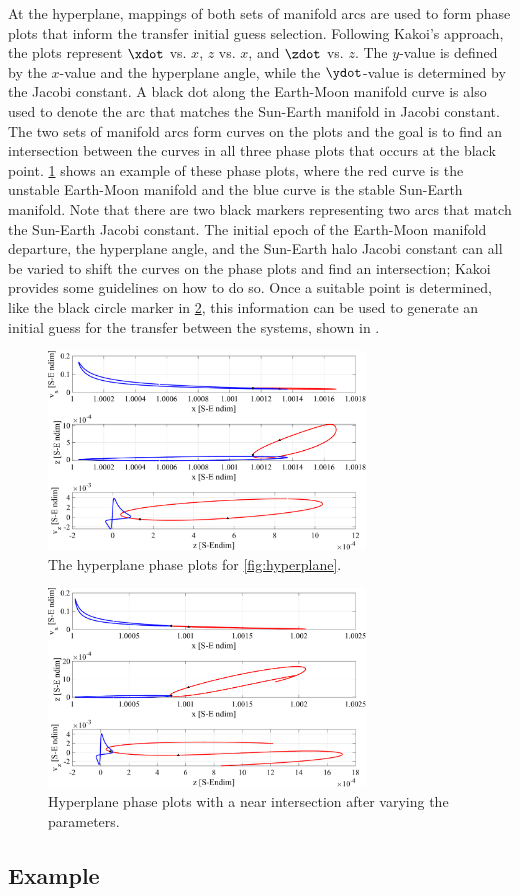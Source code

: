 At the hyperplane, mappings of both sets of manifold arcs are used to form phase plots that inform
the transfer initial guess selection. Following Kakoi's approach, the plots represent $\xdot$ vs.
$x$, $z$ vs. $x$, and $\zdot$ vs. $z$. The $y$-value is defined by the $x$-value and the hyperplane
angle, while the $\ydot$-value is determined by the Jacobi constant\cite{Kakoi:2015}. A black dot
along the Earth-Moon manifold curve is also used to denote the arc that matches the Sun-Earth
manifold in Jacobi constant. The two sets of manifold arcs form curves on the plots and the goal is
to find an intersection between the curves in all three phase plots that occurs at the black point.
\cref{fig:phasePlots} shows an example of these phase plots, where the red curve is the unstable
Earth-Moon manifold and the blue curve is the stable Sun-Earth manifold. Note that there are two
black markers representing two arcs that match the Sun-Earth Jacobi constant. The initial epoch of
the Earth-Moon manifold departure, the hyperplane angle, and the Sun-Earth halo Jacobi constant can
all be varied to shift the curves on the phase plots and find an intersection; Kakoi provides some
guidelines on how to do so\cite{Kakoi:2015}. Once a suitable point is determined, like the black
circle marker in \cref{fig:phasePlotsIntersect}, this information can be used to generate an
initial guess for the transfer between the systems, shown in .

\begin{figure}[ht]
    \centering
    \includegraphics[width=0.75\textwidth]{figures/PhasePlots.pdf}
    \caption{The hyperplane phase plots for \cref{fig:hyperplane}.}
    \label{fig:phasePlots}
\end{figure}

\begin{figure}[ht]
    \centering
    \includegraphics[width=0.75\textwidth]{figures/PhasePlotsIntersect.pdf}
    \caption{Hyperplane phase plots with a near intersection after varying the parameters.}
    \label{fig:phasePlotsIntersect}
\end{figure}

\subsection{Example}
